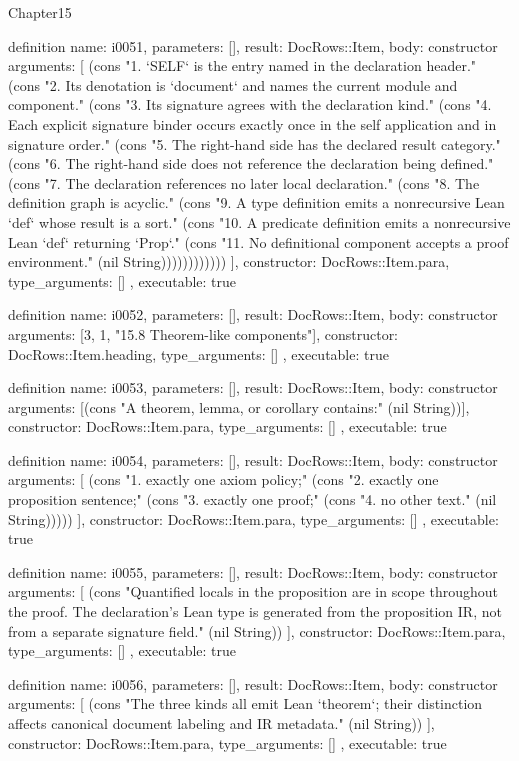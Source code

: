 \begin{lexlean}{Chapter15}
\begin{semanticmodule}
definition{
  name: i0051,
  parameters: [],
  result: DocRows::Item,
  body: constructor{
    arguments: [
      (cons "1. `SELF` is the entry named in the declaration header." (cons "2. Its denotation is `document` and names the current module and component." (cons "3. Its signature agrees with the declaration kind." (cons "4. Each explicit signature binder occurs exactly once in the self application and in signature order." (cons "5. The right-hand side has the declared result category." (cons "6. The right-hand side does not reference the declaration being defined." (cons "7. The declaration references no later local declaration." (cons "8. The definition graph is acyclic." (cons "9. A type definition emits a nonrecursive Lean `def` whose result is a sort." (cons "10. A predicate definition emits a nonrecursive Lean `def` returning `Prop`." (cons "11. No definitional component accepts a proof environment." (nil String))))))))))))
    ],
    constructor: DocRows::Item.para,
    type_arguments: []
  },
  executable: true
}

definition{
  name: i0052,
  parameters: [],
  result: DocRows::Item,
  body: constructor{
    arguments: [3, 1, "15.8 Theorem-like components"],
    constructor: DocRows::Item.heading,
    type_arguments: []
  },
  executable: true
}

definition{
  name: i0053,
  parameters: [],
  result: DocRows::Item,
  body: constructor{
    arguments: [(cons "A theorem, lemma, or corollary contains:" (nil String))],
    constructor: DocRows::Item.para,
    type_arguments: []
  },
  executable: true
}

definition{
  name: i0054,
  parameters: [],
  result: DocRows::Item,
  body: constructor{
    arguments: [
      (cons "1. exactly one axiom policy;" (cons "2. exactly one proposition sentence;" (cons "3. exactly one proof;" (cons "4. no other text." (nil String)))))
    ],
    constructor: DocRows::Item.para,
    type_arguments: []
  },
  executable: true
}

definition{
  name: i0055,
  parameters: [],
  result: DocRows::Item,
  body: constructor{
    arguments: [
      (cons "Quantified locals in the proposition are in scope throughout the proof. The declaration's Lean type is generated from the proposition IR, not from a separate signature field." (nil String))
    ],
    constructor: DocRows::Item.para,
    type_arguments: []
  },
  executable: true
}

definition{
  name: i0056,
  parameters: [],
  result: DocRows::Item,
  body: constructor{
    arguments: [
      (cons "The three kinds all emit Lean `theorem`; their distinction affects canonical document labeling and IR metadata." (nil String))
    ],
    constructor: DocRows::Item.para,
    type_arguments: []
  },
  executable: true
}


\end{semanticmodule}
\end{lexlean}
